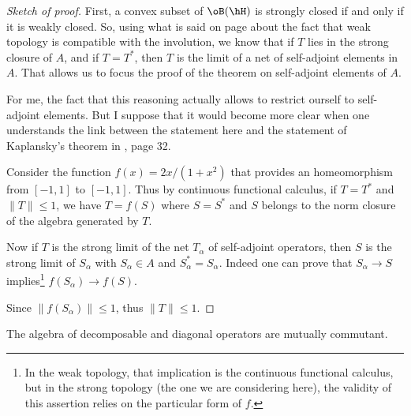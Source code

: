 \begin{proof}[Sketch of proof]
	First, a convex subset of $\oB(\hH)$ is strongly closed if and only if it is weakly closed. So, using what is said on page \pageref{PgStarWeakRespecte} about the fact that weak topology is compatible with the involution, we know that if $T$ lies in the strong closure of $A$, and if $T=T^*$, then $T$ is the limit of a net of self-adjoint elements in $A$. That allows us to focus the proof of the theorem on self-adjoint elements of $A$.

	\begin{probleme}
	For me, the fact that this reasoning actually allows to restrict ourself to self-adjoint elements. But I suppose that it would become more clear when one understands the link between the statement here and the statement of Kaplansky's theorem in \cite{JonesVN}, page 32.
	\end{probleme}

	Consider the function $f(x)=2x/(1+x^2)$ that provides an homeomorphism from $[-1,1]$ to $[-1,1]$. Thus by continuous functional calculus, if $T=T^*$ and $\| T \|\leq 1$, we have $T=f(S)$ where $S=S^*$ and $S$ belongs to the norm closure of the algebra generated by $T$.

	Now if $T$ is the strong limit of the net $T_{\alpha}$ of self-adjoint operators, then $S$ is the strong limit of $S_{\alpha}$ with $S_{\alpha}\in A$ and $S^*_{\alpha}=S_{\alpha}$. Indeed one can prove that $S_{\alpha}\to S$ implies\footnote{In the weak topology, that implication is the continuous functional calculus, but in the strong topology (the one we are considering here), the validity of this assertion relies on the particular form of $f$.} $f(S_{\alpha})\to f(S)$.

	Since $\| f(S_{\alpha}) \|\leq 1$, thus $\| T \|\leq 1$.
\end{proof}



\begin{theorem}		\label{ThoDecopDiagCommE}
The algebra of decomposable and diagonal operators are mutually commutant.
\end{theorem}

